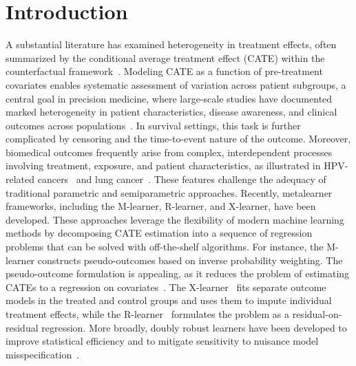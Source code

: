 \documentclass{article}
\begin{document}
\section{Introduction}
\label{intro}
    A substantial literature has examined heterogeneity in treatment effects, often summarized by the conditional average treatment effect (CATE) within the counterfactual framework~\citep{imbens2016causal}. Modeling CATE as a function of pre-treatment covariates enables systematic assessment of variation across patient subgroups, a central goal in precision medicine, where large-scale studies have documented marked heterogeneity in patient characteristics, disease awareness, and clinical outcomes across populations~\citep{dharmarajan2017ckd}.
In survival settings, this task is further complicated by censoring and the time-to-event nature of the outcome. Moreover, biomedical outcomes frequently arise from complex, interdependent processes involving treatment, exposure, and patient characteristics, as illustrated in HPV-related cancers~\citep{haddad2008hpv16} and lung cancer~\citep{zhai2022spirometry}. These features challenge the adequacy of traditional parametric and semiparametric approaches.
{   Recently, metalearner frameworks, including the M-learner, R-learner, and X-learner, have been developed. These approaches leverage the flexibility of modern machine learning methods by decomposing CATE estimation into a sequence of regression problems that can be solved with off-the-shelf algorithms.   For instance, the M-learner constructs pseudo-outcomes based on inverse probability weighting.  The pseudo-outcome formulation is  appealing, as it reduces the problem of estimating CATEs to a regression 
  on covariates~\citep{horvitz1952generalization}.    The X-learner~\citep{kunzel2019metalearners} fits separate outcome models in the treated and control groups and uses them to impute individual treatment effects, while the R-learner~\citep{nie2021quasi} formulates the problem as a residual-on-residual regression. More broadly, doubly robust learners have been developed to improve statistical efficiency and to mitigate sensitivity to nuisance model misspecification~\citep{kennedy2020towards}.}
\end{document}
